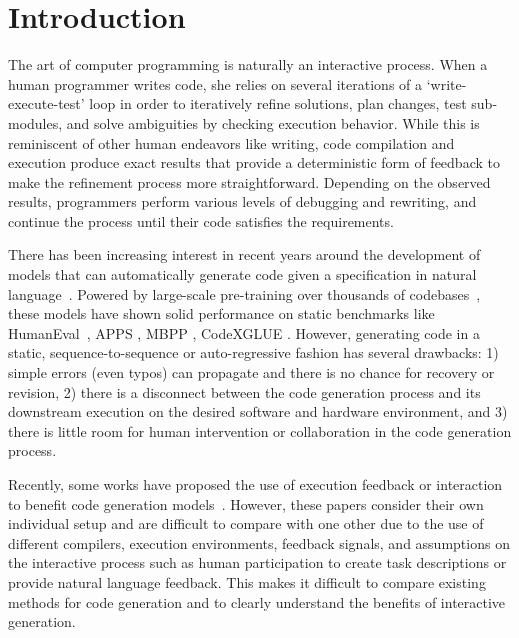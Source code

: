 \section{Introduction}
\label{sec:intro}



The art of computer programming is naturally an interactive process. When a human programmer writes code, she relies on several iterations of a `write-execute-test' loop in order to iteratively refine solutions, plan changes, test sub-modules, and solve ambiguities by checking execution behavior. While this is reminiscent of other human endeavors like writing, code compilation and execution produce exact results that provide a deterministic form of feedback to make the refinement process more straightforward. Depending on the observed results, programmers perform various levels of debugging and rewriting, and continue the process until their code satisfies the requirements.

There has been increasing interest in recent years around the development of models that can automatically generate code given a specification in natural language~\cite{feng2020codebert, wang2021codet5, clement2020pymt5, alphacode, le2022coderl}. Powered by large-scale pre-training over thousands of codebases~\cite{Agashe2019JuICeAL, husain2020codesearchnet, gao2020pile}, these models have shown solid performance on static benchmarks like HumanEval~\cite{chen2021evaluating}, APPS \cite{hendrycksapps2021}, MBPP \cite{austin2021program}, CodeXGLUE \cite{lu2021codexglue}. However, generating code in a static, sequence-to-sequence or auto-regressive fashion has several drawbacks: 1) simple errors (even typos) can propagate and there is no chance for recovery or revision, 2) there is a disconnect between the code generation process and its downstream execution on the desired software and hardware environment, and 3) there is little room for human intervention or collaboration in the code generation process. 



Recently, some works have proposed the use of execution feedback or interaction~\cite{wang2023interactive} to benefit code generation models~\cite{Lai2022DS1000, huang-etal-2022-execution, wang2023executionbased, hendrycksapps2021}. However, these papers consider their own individual setup and are difficult to compare with one other due to the use of different compilers, execution environments, feedback signals, and assumptions on the interactive process such as human participation to create task descriptions or provide natural language feedback. This makes it difficult to compare existing methods for code generation and to clearly understand the benefits of interactive generation. 


